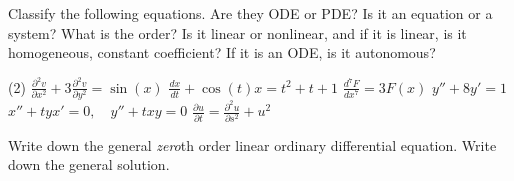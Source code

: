 \pagebreak[2]
\begin{exercise}
Classify the following equations.  Are they ODE or PDE?  Is it an equation
or a system?  What is the order?  Is it linear or nonlinear, and if it is
linear, is it homogeneous, constant coefficient?  If it is an ODE\@, is it
autonomous?
\begin{tasks}(2)
\task $\displaystyle \frac{\partial^2 v}{\partial x^2} + 3 \frac{\partial^2
v}{\partial y^2} = \sin(x)$
\task $\displaystyle \frac{d x}{dt} + \cos(t) x = t^2+t+1$
\task $\displaystyle \frac{d^7 F}{dx^7} = 3F(x)$
\task $\displaystyle y''+8y'=1$
\task $\displaystyle x''+tyx'=0, \quad y''+txy = 0$
\task $\displaystyle \frac{\partial u}{\partial t} = \frac{\partial^2 u}{\partial s^2} + u^2$
\end{tasks}
\end{exercise}

\begin{exercise}
Write down the general \emph{zero}th order linear ordinary differential
equation.  Write down the general solution.
\end{exercise}

